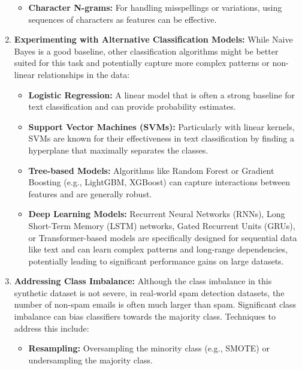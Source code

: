 \documentclass[12pt,letterpaper]{article}
\begin{document}
\begin{enumerate}
\begin{itemize}
        \item \textbf{Character N-grams:} For handling misspellings or variations, using sequences of characters as features can be effective.
    \end{itemize}
    
    \item \textbf{Experimenting with Alternative Classification Models:} While Naive Bayes is a good baseline, other classification algorithms might be better suited for this task and potentially capture more complex patterns or non-linear relationships in the data:
    \begin{itemize}
        \item \textbf{Logistic Regression:} A linear model that is often a strong baseline for text classification and can provide probability estimates.
        
        \item \textbf{Support Vector Machines (SVMs):} Particularly with linear kernels, SVMs are known for their effectiveness in text classification by finding a hyperplane that maximally separates the classes.
        
        \item \textbf{Tree-based Models:} Algorithms like Random Forest or Gradient Boosting (e.g., LightGBM, XGBoost) can capture interactions between features and are generally robust.
        
        \item \textbf{Deep Learning Models:} Recurrent Neural Networks (RNNs), Long Short-Term Memory (LSTM) networks, Gated Recurrent Units (GRUs), or Transformer-based models are specifically designed for sequential data like text and can learn complex patterns and long-range dependencies, potentially leading to significant performance gains on large datasets.
    \end{itemize}
    
    \item \textbf{Addressing Class Imbalance:} Although the class imbalance in this synthetic dataset is not severe, in real-world spam detection datasets, the number of non-spam emails is often much larger than spam. Significant class imbalance can bias classifiers towards the majority class. Techniques to address this include:
    \begin{itemize}
        \item \textbf{Resampling:} Oversampling the minority class (e.g., SMOTE) or undersampling the majority class.
        

\end{itemize}
\end{enumerate}
\end{document}
